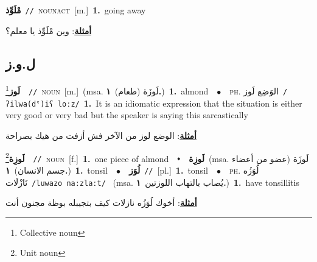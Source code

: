 \documentclass[10pt,a4paper,twoside]{article} %
\begin{document}
\begin{multicols}{2}
{\setlength\topsep{0pt}\textbf{\foreignlanguage{arabic}{مْلَوِّذ}}\ {\color{gray}\texttt{//}\color{black}}\ \textsc{noun\textunderscore act}\ [m.]\ \textbf{1.}~going away\  \begin{flushright}\color{gray}\foreignlanguage{arabic}{\textbf{\underline{\foreignlanguage{arabic}{أمثلة}}}: وين مْلَوِّذ يا معلم؟}\end{flushright}\color{black}} \vspace{2mm}

\vspace{-3mm}
\subsection*{\color{blue}\foreignlanguage{arabic}{ل.و.ز}\color{blue}{}} 

{\setlength\topsep{0pt}\textbf{\foreignlanguage{arabic}{لَوز}}\footnote{Collective noun}\ \ {\color{gray}\texttt{//}\color{black}}\ \textsc{noun}\ [m.]\ \color{gray}(msa. \foreignlanguage{arabic}{لَوزَة (طعام)}~\foreignlanguage{arabic}{\textbf{١.}})\color{black}\ \textbf{1.}~almond\ \ $\bullet$\ \ \textsc{ph.} \color{gray} \foreignlanguage{arabic}{الوَضِع لَوز}\color{black}\ {\color{gray}\texttt{/{\sffamily ʔilwa(dˤ)iʕ loːz}/}\color{black}}\ \textbf{1.}~It is an idiomatic expression that the situation is either very good or very bad but the speaker is saying this sarcastically\  \begin{flushright}\color{gray}\foreignlanguage{arabic}{\textbf{\underline{\foreignlanguage{arabic}{أمثلة}}}: الوضع لوز من الآخر فش أزفت من هيك بصراحة}\end{flushright}\color{black}} \vspace{2mm}

{\setlength\topsep{0pt}\textbf{\foreignlanguage{arabic}{لَوزِة}}\footnote{Unit noun}\ \ {\color{gray}\texttt{//}\color{black}}\ \textsc{noun}\ [f.]\ \textbf{1.}~one piece of almond\ \ $\smblkdiamond$\ \ \setlength\topsep{0pt}\textbf{\foreignlanguage{arabic}{لَوزِة}}\ \color{gray}(msa. \foreignlanguage{arabic}{لَوزَة (عضو من أعضاء جسم الانسان)}~\foreignlanguage{arabic}{\textbf{١.}})\color{black}\ \textbf{1.}~tonsil\ \ $\bullet$\ \ \setlength\topsep{0pt}\textbf{\foreignlanguage{arabic}{لُوَز}}\ {\color{gray}\texttt{//}\color{black}}\ [pl.]\ \textbf{1.}~tonsil\ \ $\bullet$\ \ \textsc{ph.} \color{gray} \foreignlanguage{arabic}{لُوَزُه نَازْلَات}\color{black}\ {\color{gray}\texttt{/{\sffamily luwazo naːzlaːt}/}\color{black}}\ \color{gray} (msa. \foreignlanguage{arabic}{يُصاب بالتهاب اللوزتين}~\foreignlanguage{arabic}{\textbf{١.}})\color{black}\ \textbf{1.}~have tonsillitis\  \begin{flushright}\color{gray}\foreignlanguage{arabic}{\textbf{\underline{\foreignlanguage{arabic}{أمثلة}}}: أخوك لُوَزُه نازلات كيف بتجيبله بوظة مجنون أنت}\end{flushright}\color{black}} \vspace{2mm}


\end{multicols}
\end{document}
